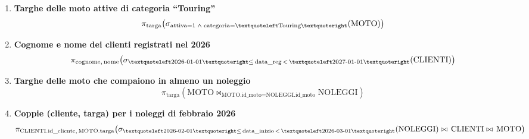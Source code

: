 \documentclass[a4paper,12pt]{article}
\begin{document}
	\begin{enumerate}
		
		\item \textbf{Targhe delle moto attive di categoria ``Touring''}
		\[
		\pi_{\text{targa}}\!\left(
		\sigma_{\text{attiva}=1\;\wedge\;\text{categoria}=\textquoteleft\text{Touring}\textquoteright}
		(\text{MOTO})
		\right)
		\]
		
		\item \textbf{Cognome e nome dei clienti registrati nel 2026}
		\[
		\pi_{\text{cognome},\,\text{nome}}\!\left(
		\sigma_{\textquoteleft\text{2026-01-01}\textquoteright
			\le\,\text{data\_reg}\,<\,
			\textquoteleft\text{2027-01-01}\textquoteright}
		(\text{CLIENTI})
		\right)
		\]
		
		\item \textbf{Targhe delle moto che compaiono in almeno un noleggio}
		\[
		\pi_{\text{targa}}\!\left(
		\text{MOTO}
		\bowtie_{\text{MOTO.id\_moto}=\text{NOLEGGI.id\_moto}}
		\text{NOLEGGI}
		\right)
		\]

		
		\item \textbf{Coppie (cliente, targa) per i noleggi di febbraio 2026}
		\[
		\pi_{\text{CLIENTI.id\_cliente},\,\text{MOTO.targa}}\!\left(
		\sigma_{\textquoteleft\text{2026-02-01}\textquoteright
			\le\,\text{data\_inizio}\,<\,
			\textquoteleft\text{2026-03-01}\textquoteright}
		(\text{NOLEGGI})
		\bowtie\,\text{CLIENTI}
		\bowtie\,\text{MOTO}
		\right)
		\]
		

		
	\end{enumerate}
	
\end{document}

